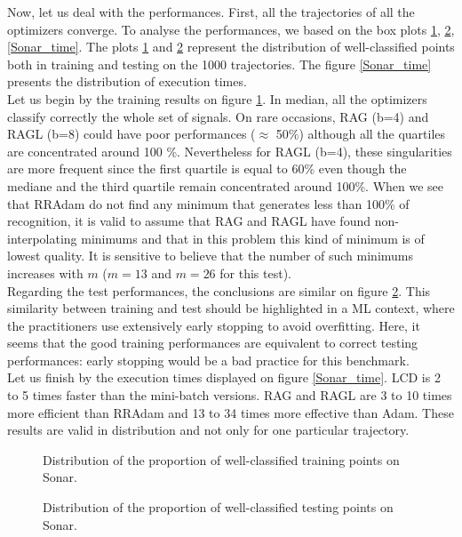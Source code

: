 Now, let us deal with the performances. First, all the trajectories of all the optimizers converge. To analyse the performances, we based on the box plots \ref{Sonar_train}, \ref{Sonar_test}, \ref{Sonar_time}. The plots \ref{Sonar_train} and \ref{Sonar_test} represent the distribution of well-classified points both in training and testing on the 1000 trajectories. The figure \ref{Sonar_time} presents the distribution of execution times. \\
Let us begin by the training results on figure \ref{Sonar_train}. In median, all the optimizers classify correctly the whole set of signals. On rare occasions, RAG (b=4) and RAGL (b=8) could have poor performances ($\approx$ 50\%) although all the quartiles are concentrated around 100 \%. Nevertheless for RAGL (b=4), these singularities are more frequent since the first quartile is equal to 60\% even though the mediane and the third quartile remain concentrated around 100\%. When we see that RRAdam do not find any minimum that generates less than 100\% of recognition, it is valid to assume that RAG and RAGL have found non-interpolating minimums and that in this problem this kind of minimum is of lowest quality. It is sensitive to believe that the number of such minimums increases with $m$ ($m=13$ and $m=26$ for this test).\\
Regarding the test performances, the conclusions are similar on figure \ref{Sonar_test}. This similarity between training and test should be highlighted in a ML context, where the practitioners use extensively early stopping to avoid overfitting. Here, it seems that the good training performances are equivalent to correct testing performances:  early stopping would be a bad practice for this benchmark. \\
Let us finish by the execution times displayed on figure \ref{Sonar_time}. LCD is 2 to 5 times faster than the mini-batch versions. RAG and RAGL are 3 to 10 times more efficient
than RRAdam and 13 to 34 times more effective than Adam. These results are valid in distribution and not only for one particular trajectory. %

\begin{figure}[h!]
	\centering
	\scalebox{0.9}{}
	\caption{Distribution of the proportion of well-classified training points on Sonar.}
	\label{Sonar_train}
\end{figure}

\begin{figure}[h!]
	\centering
	\scalebox{0.9}{}
	\caption{Distribution of the proportion of well-classified testing points on Sonar.}
	\label{Sonar_test}
\end{figure}

